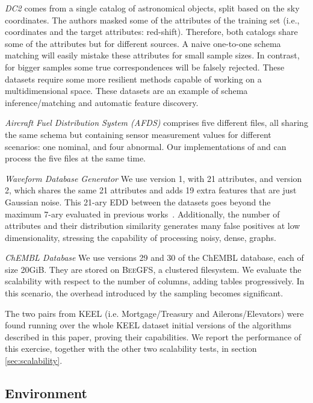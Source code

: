 \emph{DC2} comes from a single catalog of astronomical
    objects, split based on the sky coordinates.
    The authors masked some of the attributes of the training set (i.e., coordinates and the
    target attributes: red-shift). 
    Therefore, both catalogs share some of the attributes but for different sources.
    A naive one-to-one schema matching will
    easily mistake these attributes for small sample sizes. In contrast, for bigger samples
    some true correspondences will be falsely rejected.
    These datasets require some more resilient methods capable of working on a
    multidimensional space.
    These datasets are an example of schema inference/matching and automatic feature discovery.
    
\emph{Aircraft Fuel Distribution System (AFDS)} comprises five different files,
    all sharing the same schema but containing sensor measurement values for different scenarios:
    one nominal, and four abnormal. Our implementations of \Find and \PresQ can process
    the five files at the same time.

\emph{Waveform Database Generator}
    We use version 1, with 21 attributes, and version 2, which shares the same 21 attributes and adds 19
    extra features that are just Gaussian noise. This 21-ary \gls{EDD} between the datasets goes
    beyond the maximum 7-ary evaluated in previous works~\cite{Dursch2019}.
    Additionally, the number of attributes and their distribution similarity generates many false positives at low
    dimensionality, stressing the capability of processing noisy, dense, graphs.

\emph{ChEMBL Database}
    We use versions 29 and 30 of the ChEMBL database, each of size 20GiB. They are
    stored on \textsc{BeeGFS}, a clustered filesystem. We evaluate the scalability with respect to the number of
    columns, adding tables progressively. In this scenario, the overhead introduced by the sampling becomes significant.

The two pairs from KEEL (i.e. Mortgage/Treasury and Ailerons/Elevators) were found
running over the whole KEEL dataset initial versions of the algorithms described in
this paper, proving their capabilities. We report the performance of this exercise, together
with the other two scalability tests, in section \ref{sec:scalability}.

\subsection{Environment}

